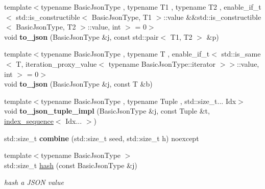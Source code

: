 \begin{DoxyCompactItemize}
\item 
\mbox{\label{namespacenlohmann_1_1detail_ab64eeb55b44db44eb8e9070229eb97df}} 
{\footnotesize template$<$typename Basic\+Json\+Type , typename T1 , typename T2 , enable\+\_\+if\+\_\+t$<$ std\+::is\+\_\+constructible$<$ Basic\+Json\+Type, T1 $>$\+::value \&\&std\+::is\+\_\+constructible$<$ Basic\+Json\+Type, T2 $>$\+::value, int $>$  = 0$>$ }\\void {\bfseries to\+\_\+json} (Basic\+Json\+Type \&j, const std\+::pair$<$ T1, T2 $>$ \&p)
\item 
\mbox{\label{namespacenlohmann_1_1detail_aaa77b0c9745130b77733a92a1a2e82ec}} 
{\footnotesize template$<$typename Basic\+Json\+Type , typename T , enable\+\_\+if\+\_\+t$<$ std\+::is\+\_\+same$<$ T, iteration\+\_\+proxy\+\_\+value$<$ typename Basic\+Json\+Type\+::iterator $>$$>$\+::value, int $>$  = 0$>$ }\\void {\bfseries to\+\_\+json} (Basic\+Json\+Type \&j, const T \&b)
\item 
\mbox{\label{namespacenlohmann_1_1detail_a510dfa15b01e9a8afe31600a27b28199}} 
{\footnotesize template$<$typename Basic\+Json\+Type , typename Tuple , std\+::size\+\_\+t... Idx$>$ }\\void {\bfseries to\+\_\+json\+\_\+tuple\+\_\+impl} (Basic\+Json\+Type \&j, const Tuple \&t, \hyperlink{structnlohmann_1_1detail_1_1integer__sequence}{index\+\_\+sequence}$<$ Idx... $>$)
\item 
\mbox{\label{namespacenlohmann_1_1detail_a66eb4d912b6f872d6983f7d0826f32c6}} 
std\+::size\+\_\+t {\bfseries combine} (std\+::size\+\_\+t seed, std\+::size\+\_\+t h) noexcept
\item 
{\footnotesize template$<$typename Basic\+Json\+Type $>$ }\\std\+::size\+\_\+t \hyperlink{namespacenlohmann_1_1detail_a679e5e522ac6afa5d5923292fab450b8}{hash} (const Basic\+Json\+Type \&j)
\begin{DoxyCompactList}\small\item\em hash a J\+S\+ON value \end{DoxyCompactList}\item 
\mbox{\label{namespacenlohmann_1_1detail_ad11a087dbe66eade5af4056aef9600bf}} 

\end{DoxyCompactItemize}

